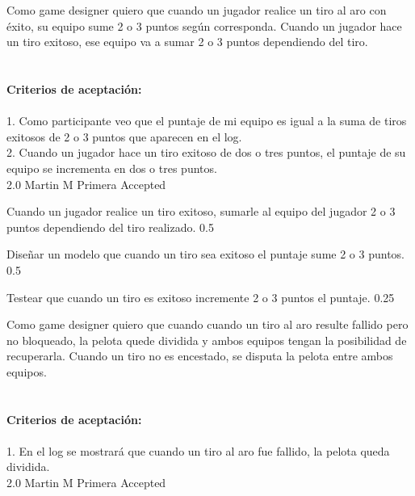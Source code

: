 	{Como game designer quiero que cuando un jugador realice un tiro al aro con \'exito, su equipo sume 2 o 3 puntos seg\'un corresponda.} %
	{Cuando un jugador hace un tiro exitoso, ese equipo va a sumar 2 o 3 puntos dependiendo del tiro. \\
  \\
  \\
\textbf{Criterios de aceptación:}\\
  \\
1. Como participante veo que el puntaje de mi equipo es igual a la suma de tiros exitosos de 2 o 3 puntos que aparecen en el log. \\
2. Cuando un jugador hace un tiro exitoso de dos o tres puntos, el puntaje de su equipo se incrementa en dos o tres puntos. \\
} %
	{} %
	{2.0} %
	{Martin M} %
	{Primera} %
	{Accepted} %

		{Cuando un jugador realice un tiro exitoso, sumarle al equipo del jugador 2 o 3 puntos dependiendo del tiro realizado.} %
		{} %
		{0.5} %
		{} %
		{} %
		{} %

		{Diseñar un modelo que cuando un tiro sea exitoso el puntaje sume 2 o 3 puntos.} %
		{} %
		{0.5} %
		{} %
		{} %
		{} %

		{Testear que cuando un tiro es exitoso incremente 2 o 3 puntos el puntaje.} %
		{} %
		{0.25} %
		{} %
		{} %
		{} %
\vspace{20pt}


	{Como game designer quiero que cuando cuando un tiro al aro resulte fallido pero no bloqueado, la pelota quede dividida y ambos equipos tengan la posibilidad de recuperarla.} %
	{Cuando un tiro no es encestado, se disputa la pelota entre ambos equipos. \\
  \\
  \\
\textbf{Criterios de aceptación:}\\
  \\
1. En el log se mostrará que cuando un tiro al aro fue fallido, la pelota queda dividida. \\
} %
	{} %
	{2.0} %
	{Martin M} %
	{Primera} %
	{Accepted} %

